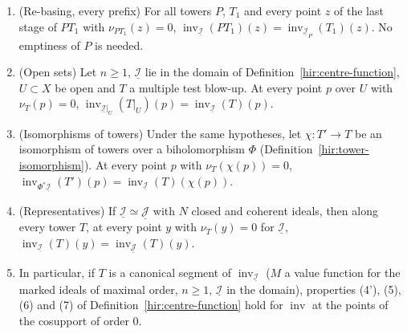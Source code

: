 \begin{lemma}
\begin{enumerate}
\(\gamma\) have the same value.
\item (Re-basing, every prefix) For all towers \(P\), \(T_1\) and every point \(z\) of the last stage of \(PT_1\) with \(\nu_{PT_1}(z)=0\),
\(\operatorname{inv}_{\underline{\mathcal I}}(PT_1)(z)=\operatorname{inv}_{\underline{\mathcal I}_P}(T_1)(z)\). No emptiness of \(P\) is needed.
\item (Open sets) Let \(n\ge1\), \(\underline{\mathcal I}\) lie in the domain of Definition~\ref{hir:centre-function}, \(U\subset X\) be open and \(T\) a multiple test blow-up. At
every point \(p\) over \(U\) with \(\nu_T(p)=0\), \(\operatorname{inv}_{\underline{\mathcal I}|_U}(T|_U)(p)=\operatorname{inv}_{\underline{\mathcal I}}(T)(p)\).
\item (Isomorphisms of towers) Under the same hypotheses, let \(\chi\colon T'\to T\) be an isomorphism of towers over a biholomorphism \(\Phi\)
(Definition~\ref{hir:tower-isomorphism}). At every point \(p\) with \(\nu_T(\chi(p))=0\),
\(\operatorname{inv}_{\Phi^*\underline{\mathcal I}}(T')(p)=\operatorname{inv}_{\underline{\mathcal I}}(T)(\chi(p))\).
\item (Representatives) If \(\underline{\mathcal I}\simeq\underline{\mathcal J}\) with \(N\) closed and coherent ideals, then along every tower \(T\), at every point \(y\) with
\(\nu_T(y)=0\) for \(\underline{\mathcal I}\), \(\operatorname{inv}_{\underline{\mathcal I}}(T)(y)=\operatorname{inv}_{\underline{\mathcal J}}(T)(y)\).
\item In particular, if \(T\) is a canonical segment of \(\operatorname{inv}_{\underline{\mathcal I}}\) (\(M\) a value function for the marked ideals of maximal order, \(n\ge1\),
\(\underline{\mathcal I}\) in the domain), properties (4'), (5), (6) and (7) of Definition~\ref{hir:centre-function} hold for \(\operatorname{inv}\) at the points of the cosupport of
order \(0\).
\end{enumerate}
\end{lemma}
